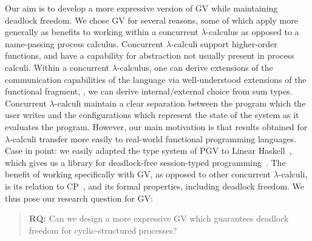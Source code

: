 \documentclass[main.tex]{subfiles}
\begin{document}
Our aim is to develop a more expressive version of GV while maintaining deadlock freedom. We chose GV for several reasons, some of which apply more generally as benefits to working within a concurrent $\lambda$-calculus as opposed to a name-passing process calculus. Concurrent $\lambda$-calculi support higher-order functions, and have a capability for abstraction not usually present in process calculi. Within a concurrent $\lambda$-calculus, one can derive extensions of the communication capabilities of the language via well-understood extensions of the functional fragment, \eg, we can derive internal/external choice from sum types. Concurrent $\lambda$-calculi maintain a clear separation between the program which the user writes and the configurations which represent the state of the system as it evaluates the program. However, our main motivation is that results obtained for $\lambda$-calculi transfer more easily to real-world functional programming languages. Case in point: we easily adapted the type system of PGV to Linear Haskell~\cite{bernardyboespflug18}, which gives us a library for deadlock-free session-typed programming~\cite{kokkedardha21hs}. %
The benefit of working specifically with GV, as opposed to other concurrent $\lambda$-calculi, is its relation to CP~\cite{wadler14}, and its formal properties, including deadlock freedom. We thus pose our research question for GV:
\begin{quotation}
  \textbf{RQ:}
  Can we design a more expressive GV which guarantees deadlock freedom for cyclic-structured processes?
\end{quotation}
\end{document}
